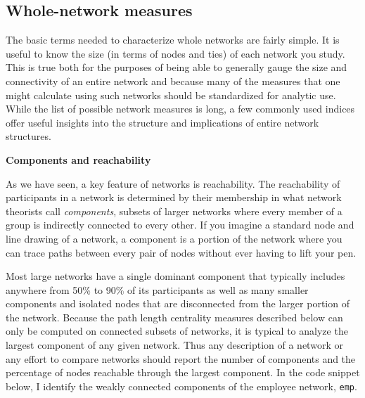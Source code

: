 \documentclass[]{krantz}
\begin{document}
\subsection{Whole-network measures}\label{whole-network-measures}

The basic terms needed to characterize whole networks are fairly simple.
It is useful to know the size (in terms of nodes and ties) of each
network you study. This is true both for the purposes of being able to
generally gauge the size and connectivity of an entire network and
because many of the measures that one might calculate using such
networks should be standardized for analytic use. While the list of
possible network measures is long, a few commonly used indices offer
useful insights into the structure and implications of entire network
structures.

\textbf{Components and reachability}

As we have seen, a key feature of networks is reachability. The
reachability of participants in a network is determined by their
membership in what network theorists call \emph{components}, subsets of
larger networks where every member of a group is indirectly connected to
every other. If you imagine a standard node and line drawing of a
network, a component is a portion of the network where you can trace
paths between every pair of nodes without ever having to lift your pen.

Most large networks have a single dominant component that typically
includes anywhere from 50\% to 90\% of its participants as well as many
smaller components and isolated nodes that are disconnected from the
larger portion of the network. Because the path length centrality
measures described below can only be computed on connected subsets of
networks, it is typical to analyze the largest component of any given
network. Thus any description of a network or any effort to compare
networks should report the number of components and the percentage of
nodes reachable through the largest component. In the code snippet
below, I identify the weakly connected components of the employee
network, \texttt{emp}.
\end{document}
